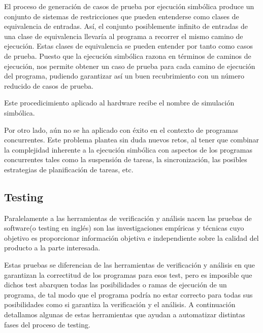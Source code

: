 El proceso de generaci\'on de casos de prueba por ejecuci\'on simb\'olica produce un conjunto de sistemas de restricciones que pueden entenderse como clases de equivalencia de entradas. As\'i, el conjunto posiblemente infinito de entradas de una clase de equivalencia llevar\'ia al programa a recorrer el mismo camino de ejecuci\'on. Estas clases de equivalencia se pueden entender por tanto como casos de prueba. Puesto que la ejecuci\'on simb\'olica razona en t\'erminos de caminos de ejecuci\'on, nos permite obtener un caso de prueba para cada camino de ejecuci\'on del programa, pudiendo garantizar as\'i un buen recubrimiento con un n\'umero reducido de casos de prueba.

Este procedicimiento aplicado al hardware recibe el nombre de simulaci\'on simb\'olica.

Por otro lado, a\'un no se ha aplicado con \'exito en el contexto de programas concurrentes. Este problema plantea sin duda nuevos retos, al tener que combinar la complejidad inherente a la ejecuci\'on simb\'olica con aspectos de los programas concurrentes tales como la suspensi\'on de tareas, la sincronizaci\'on, las posibles estrategias de planificaci\'on de tareas, etc.


%

\subsection{Testing}

Paralelamente a las herramientas de verificaci\'on y an\'alisis nacen las pruebas de software(o testing en ingl\'es) son las investigaciones emp\'iricas y t\'ecnicas cuyo objetivo es proporcionar informaci\'on objetiva e independiente sobre la calidad del producto a la parte interesada.  

Estas pruebas se diferencian de las herramientas de verificaci\'on y an\'alisis en que garantizan la correctitud de los programas para esos test, pero es imposible que dichos test abarquen todas las posibilidades o ramas de ejecuci\'on de un programa, de tal modo que el programa podr\'ia no estar correcto para todas sus posibilidades como si garantiza la verificaci\'on y el an\'alisis. A continuaci\'on detallamos algunas de estas herramientas que ayudan a automatizar distintas fases del proceso de testing.

